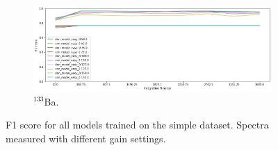 \begin{figure}[H]
     \begin{subfigure}[b]{0.9\textwidth}
         \centering
         \includegraphics[width=\textwidth]{images/results_easy_distance_comparison}
         \caption{$^{133}$Ba.}
         \label{fig:results_easy_distance_comparison_full}
     \end{subfigure}

        \caption{F1 score for all models trained on the simple dataset. Spectra measured with different gain settings.}
        \label{fig:results_easy_distance_comparison}
\end{figure}


